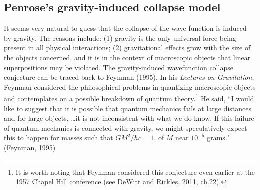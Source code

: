 \subsection{Penrose's gravity-induced  collapse model}

It seems very natural to guess that the collapse of the wave function is induced by gravity. The reasons include: (1) gravity is the only universal force being present in all physical interactions; (2) gravitational effects grow with the size of the objects concerned, and it is in the context of macroscopic objects that linear superpositions may be violated. The gravity-induced wavefunction collapse conjecture can be traced back to Feynman (1995). In his \emph{Lectures on Gravitation}, Feynman considered the philosophical problems in quantizing macroscopic objects and contemplates on a possible breakdown of quantum theory.\footnote{It is worth noting that Feynman considered this conjecture even earlier at the 1957 Chapel Hill conference (see DeWitt and Rickles, 2011, ch.22).} He said, ``I would like to suggest that it is possible that quantum mechanics fails at large distances and for large objects, …it is not inconsistent with what we do know. If this failure of quantum mechanics is connected with gravity, we might speculatively expect this to happen for masses such that $GM^2/\hbar c=1$, of $M$ near $10^{-5}$ grams." (Feynman, 1995)

